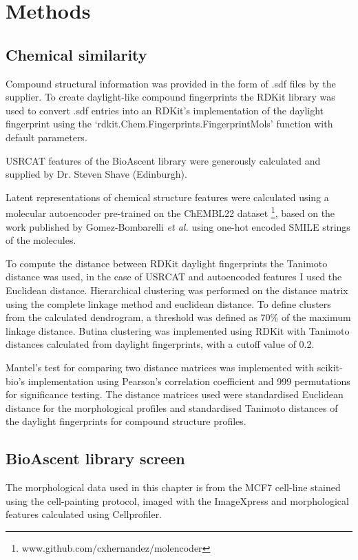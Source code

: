 \documentclass[a4paper,11pt,twoside,openright]{scrbook}
\begin{document}
\section{Methods}

\subsection{Chemical similarity}
Compound structural information was provided in the form of .sdf files by the supplier.
To create daylight-like compound fingerprints the RDKit library was used to convert .sdf entries into an RDKit's implementation of the daylight fingerprint using the `rdkit.Chem.Fingerprints.FingerprintMols' function with default parameters.

USRCAT features of the BioAscent library were generously calculated and supplied by Dr. Steven Shave (Edinburgh).

Latent representations of chemical structure features were calculated using a molecular autoencoder pre-trained on the ChEMBL22 dataset \footnote{www.github.com/cxhernandez/molencoder}, based on the work published by Gomez-Bombarelli \textit{et al.} \cite{Gomez-Bombarelli2016} using one-hot encoded SMILE strings of the molecules.

To compute the distance between RDKit daylight fingerprints the Tanimoto distance was used, in the case of USRCAT and autoencoded features I used the Euclidean distance.
Hierarchical clustering was performed on the distance matrix using the complete linkage method and euclidean distance.
To define clusters from the calculated dendrogram, a threshold was defined as 70\% of the maximum linkage distance.
Butina clustering was implemented using RDKit with Tanimoto distances calculated from daylight fingerprints, with a cutoff value of 0.2.

Mantel's test for comparing two distance matrices was implemented with scikit-bio's implementation using Pearson's correlation coefficient and 999 permutations for significance testing.
The distance matrices used were standardised Euclidean distance for the morphological profiles and standardised Tanimoto distances of the daylight fingerprints for compound structure profiles.


\subsection{BioAscent library screen}

The morphological data used in this chapter is from the MCF7 cell-line stained using the cell-painting protocol, imaged with the ImageXpress and morphological features calculated using Cellprofiler.
\end{document}
